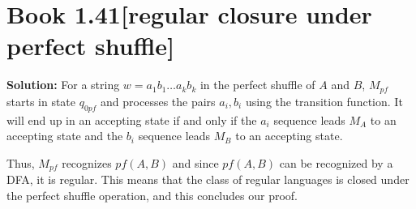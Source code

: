 \documentclass[11pt]{article}
\newenvironment{question}[2]
{\newpage\section{#1\texorpdfstring{\hfill}{horizontal spacing}{\rm\normalsize #2}}}{}
\newenvironment{solution}
{\textbf{Solution: }\color{blue}}
{\color{black}}
\begin{document}
\begin{question}{Book 1.41}{[regular closure under perfect shuffle]}
\begin{solution}
For a string \(w = a_1 b_1 \ldots a_k b_k\) in the perfect shuffle of \(A\) and \(B\), \(M_{pf}\) starts in state \(q_{0pf}\) and processes the pairs \(a_i,b_i\) using the transition function. It will end up in an accepting state if and only if the \(a_i\) sequence leads \(M_A\) to an accepting state and the \(b_i\) sequence leads \(M_B\) to an accepting state.

Thus, \(M_{pf}\) recognizes \(pf(A,B)\) and since \(pf(A,B)\) can be recognized by a DFA, it is regular. This means that the class of regular languages is closed under the perfect shuffle operation, and this concludes our proof.

\end{solution}
\end{question}

\end{document}
